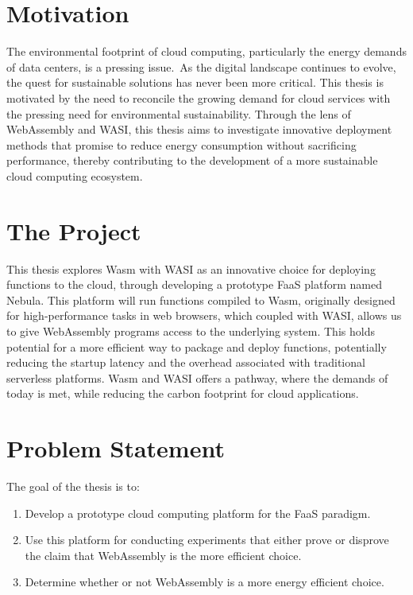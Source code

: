 \documentclass[
  table]{report}
\providecommand{\tightlist}{%
  \setlength{\itemsep}{0pt}\setlength{\parskip}{0pt}}
\begin{document}
\section{Motivation}
\label{sect:motivation}

The environmental footprint of cloud computing, particularly the energy
demands of data centers, is a pressing issue.~As the digital landscape
continues to evolve, the quest for sustainable solutions has never been
more critical. This thesis is motivated by the need to reconcile the
growing demand for cloud services with the pressing need for
environmental sustainability. Through the lens of WebAssembly and
\ac{WASI}, this thesis aims to investigate innovative deployment methods
that promise to reduce energy consumption without sacrificing
performance, thereby contributing to the development of a more
sustainable cloud computing ecosystem.

\section{The Project}
\label{sect:project}

This thesis explores \ac{Wasm} with \ac{WASI} as an innovative choice
for deploying functions to the cloud, through developing a prototype
\ac{FaaS} platform named Nebula. This platform will run functions
compiled to \ac{Wasm}, originally designed for high-performance tasks in
web browsers, which coupled with \ac{WASI}, allows us to give
WebAssembly programs access to the underlying system. This holds
potential for a more efficient way to package and deploy functions,
potentially reducing the startup latency and the overhead associated
with traditional serverless platforms. \ac{Wasm} and \ac{WASI} offers a
pathway, where the demands of today is met, while reducing the carbon
footprint for cloud applications.

\section{Problem Statement}
\label{sect:problems}

The goal of the thesis is to:

\begin{enumerate}
\def\labelenumi{\arabic{enumi}.}
\tightlist
\item
  Develop a prototype cloud computing platform for the \ac{FaaS}
  paradigm.
\item
  Use this platform for conducting experiments that either prove or
  disprove the claim that WebAssembly is the more efficient choice.
\item
  Determine whether or not WebAssembly is a more energy efficient
  choice.
\end{enumerate}
\end{document}
